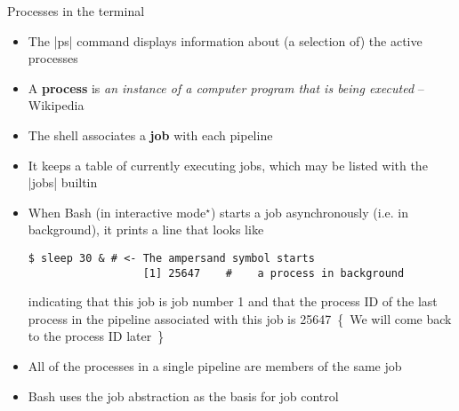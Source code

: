 
\begin{frame}[fragile]{Processes in the terminal}{}
    \vspace{-3mm}
    \begin{itemize}
        \item The \bash|ps| command displays information about (a selection of) the active processes
        \item A \alert{\textbf{process}} is \emph{\guillemotleft an instance of a computer program that is being executed\guillemotright} -- Wikipedia
        \item The shell associates a \alert{\textbf{job}} with each pipeline
        \item It keeps a table of currently executing jobs, which may be listed with the \bash|jobs| builtin
        \item When Bash (in interactive mode$^\star$) starts a job asynchronously (i.e. in background), it prints a line that looks like
              \begin{lstlisting}[style=MyBash, numbers=none, aboveskip=2mm, belowskip=-5mm, xrightmargin=25mm]
                  $ sleep 30 & # <- The ampersand symbol starts
                  [1] 25647    #    a process in background
              \end{lstlisting}
              indicating that this job is job number 1 and that the process ID of the last process in the pipeline associated with this job is 25647
              \,{\tiny\{~We will come back to the process ID later~\}}
        \item All of the processes in a single pipeline are members of the same job
        \item Bash uses the job abstraction as the basis for job control
    \end{itemize}
\end{frame}
